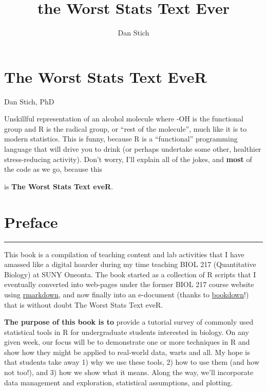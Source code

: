 \documentclass[
]{book}
\title{the Worst Stats Text Ever}
\author{Dan Stich}
\date{}
\begin{document}
\maketitle

{
\setcounter{tocdepth}{1}
\tableofcontents
}
\hypertarget{title}{%
\chapter*{The Worst Stats Text EveR}\label{title}}

Dan Stich, PhD

Unskillful representation of an alcohol molecule where -OH is the functional group and R is the radical group, or ``rest of the molecule'', much like it is to modern statistics. This is funny, because R is a ``functional'' programming language that will drive you to drink (or perhaps undertake some other, healthier stress-reducing activity). Don't worry, I'll explain all of the jokes, and \textbf{most} of the code as we go, because this

is \textbf{The Worst Stats Text eveR}.

\hypertarget{preface}{%
\chapter*{Preface}\label{preface}}

\begin{center}\rule{0.5\linewidth}{0.5pt}\end{center}

This book is a compilation of teaching content and lab activities that I have amassed like a digital hoarder during my time teaching BIOL 217 (Quantitative Biology) at SUNY Oneonta. The book started as a collection of R scripts that I eventually converted into web-pages under the former BIOL 217 course website using \href{https://rmarkdown.rstudio.com/}{rmarkdown}, and now finally into an e-document (thanks to \href{https://bookdown.org/home/about/}{bookdown}!) that is without doubt The Worst Stats Text eveR.

\textbf{The purpose of this book is to} provide a tutorial survey of commonly used statistical tools in R for undergraduate students interested in biology. On any given week, our focus will be to demonstrate one or more techniques in R and show how they might be applied to real-world data, warts and all. My hope is that students take away 1) why we use these tools, 2) how to use them (and how not too!), and 3) how we show what it means. Along the way, we'll incorporate data management and exploration, statistical assumptions, and plotting.
\end{document}
